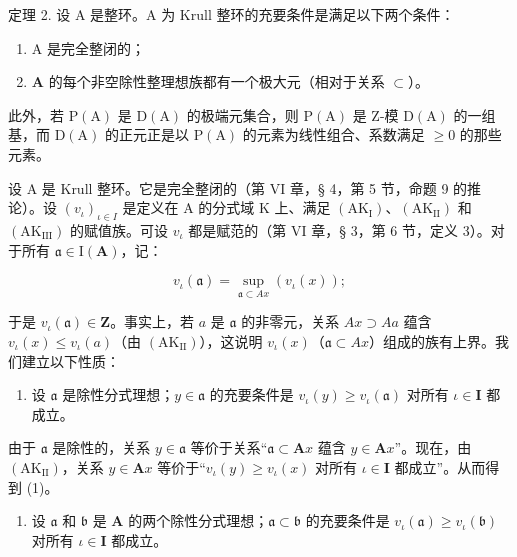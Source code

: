 定理 2. 设 A 是整环。A 为 Krull 整环的充要条件是满足以下两个条件：

\begin{enumerate}
\def\labelenumi{(\alph{enumi})}
\item
  A 是完全整闭的；
\item
  \(\mathbf{A}\) 的每个非空除性整理想族都有一个极大元（相对于关系 \(\subset\)）。
\end{enumerate}

此外，若 \(\mathrm{P}(\mathrm{A})\) 是 \(\mathrm{D}(\mathrm{A})\) 的极端元集合，则 \(\mathrm{P}(\mathrm{A})\) 是 Z-模 \(\mathrm{D}(\mathrm{A})\) 的一组基，而 \(\mathrm{D}(\mathrm{A})\) 的正元正是以 \(\mathrm{P}(\mathrm{A})\) 的元素为线性组合、系数满足 \(\geqslant0\) 的那些元素。

设 A 是 Krull 整环。它是完全整闭的（第 VI 章，§ 4，第 5 节，命题 9 的推论）。设 \((v_{\iota})_{\iota\in I}\) 是定义在 A 的分式域 K 上、满足 \((\mathrm{AK}_{\mathrm{I}})\)、\((\mathrm{AK}_{\mathrm{II}})\) 和 \((\mathrm{AK}_{\mathrm{III}})\) 的赋值族。可设 \(v_{\iota}\) 都是赋范的（第 VI 章，§ 3，第 6 节，定义 3）。对于所有 \(\mathfrak{a} \in \mathrm{I}(\mathbf{A})\)，记：

\[
v _ {\iota} (\mathfrak{a}) = \sup _ {\mathfrak{a} \subset Ax} (v _ {\iota} (x));\tag{3}
\]

于是 \(v_{\iota}(\mathfrak{a}) \in \mathbf{Z}\)。事实上，若 \(a\) 是 \(\mathfrak{a}\) 的非零元，关系 \(Ax \supset Aa\) 蕴含 \(v_{\iota}(x) \leqslant v_{\iota}(a)\)（由 \((\mathrm{AK}_{\mathrm{II}})\)），这说明 \(v_{\iota}(x)\)（\(\mathfrak{a} \subset Ax\)）组成的族有上界。我们建立以下性质：

\begin{enumerate}
\def\labelenumi{(\arabic{enumi})}
\tightlist
\item
  设 \(\mathfrak{a}\) 是除性分式理想；\(y \in \mathfrak{a}\) 的充要条件是 \(v_{\iota}(y) \geqslant v_{\iota}(\mathfrak{a})\) 对所有 \(\iota \in \mathbf{I}\) 都成立。
\end{enumerate}

由于 \(\mathfrak{a}\) 是除性的，关系 \(y \in \mathfrak{a}\) 等价于关系“\(\mathfrak{a} \subset \mathbf{A}x\) 蕴含 \(y \in \mathbf{A}x\)”。现在，由 \((\mathrm{AK}_{\mathrm{II}})\)，关系 \(y \in \mathbf{A}x\) 等价于“\(v_{\iota}(y) \geqslant v_{\iota}(x)\) 对所有 \(\iota \in \mathbf{I}\) 都成立”。从而得到 (1)。

\begin{enumerate}
\def\labelenumi{(\arabic{enumi})}
\setcounter{enumi}{1}
\tightlist
\item
  设 \(\mathfrak{a}\) 和 \(\mathfrak{b}\) 是 \(\mathbf{A}\) 的两个除性分式理想；\(\mathfrak{a} \subset \mathfrak{b}\) 的充要条件是 \(v_{\iota}(\mathfrak{a}) \geqslant v_{\iota}(\mathfrak{b})\) 对所有 \(\iota \in \mathbf{I}\) 都成立。
\end{enumerate}

